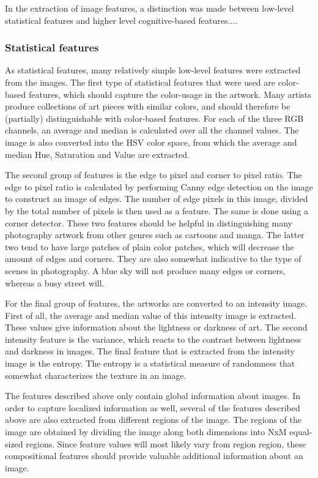 In the extraction of image features, a distinction was made between low-level statistical features and higher level cognitive-based features....

\subsubsection{Statistical features}
As statistical features, many relatively simple low-level features were extracted from the images.
The first type of statistical features that were used are color-based features, which should capture the color-usage in the artwork. Many artists produce collections of art pieces with similar colors, and should therefore be (partially) distinguishable with color-based features. For each of the three RGB channels, an average and median is calculated over all the channel values. The image is also converted into the HSV color space, from which the average and median Hue, Saturation and Value are extracted.  

The second group of features is the edge to pixel and corner to pixel ratio. The edge to pixel ratio is calculated by performing Canny edge detection on the image to construct an image of edges. The number of edge pixels in this image, divided by the total number of pixels is then used as a feature. The same is done using a corner detector. These two features should be helpful in distinguishing many photography artwork from other genres such as cartoons and manga. The latter two tend to have large patches of plain color patches, which will decrease the amount of edges and corners. They are also somewhat indicative to the type of scenes in photography. A blue sky will not produce many edges or corners, whereas a busy street will.  

For the final group of features, the artworks are converted to an intensity image. First of all, the average and median value of this intensity image is extracted. These values give information about the lightness or darkness of art. The second intensity feature is the variance, which reacts to the contrast between lightness and darkness in images. The final feature that is extracted from the intensity image is the entropy. The entropy is a statistical measure of randomness that somewhat characterizes the texture in an image.  

The features described above only contain global information about images. In order to capture localized information as well, several of the features described above are also extracted from different regions of the image. The regions of the image are obtained by dividing the image along both dimensions into NxM equal-sized regions. Since feature values will most likely vary from region region, these compositional features should provide valuable additional information about an image. 




